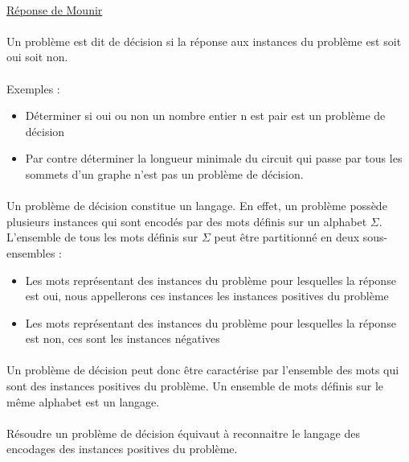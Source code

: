 \paragraph{}
\underline{Réponse de Mounir}
\paragraph{}
Un problème est dit de décision si la réponse aux instances du problème est soit oui soit non.
\paragraph{}
Exemples :
\begin{itemize}
\item Déterminer si oui ou non un nombre entier n est pair est un problème de décision
\item Par contre déterminer la longueur minimale du circuit qui passe par tous les sommets d’un graphe n’est pas un problème de décision.
\end{itemize}
\paragraph{}
Un problème de décision constitue un langage. En effet, un problème possède plusieurs instances qui sont encodés par des mots définis sur un alphabet $\Sigma$. L’ensemble de tous les mots définis sur $\Sigma$ peut être partitionné en deux sous-ensembles :
\begin{itemize}
\item Les mots représentant des instances du problème pour lesquelles la réponse est oui, nous appellerons ces instances les instances positives du problème
\item Les mots représentant des instances du problème pour lesquelles la réponse est non, ces sont les instances négatives
\end{itemize}
\paragraph{}
Un problème de décision peut donc être caractérise par l’ensemble des mots qui sont des instances positives du problème. Un ensemble de mots définis sur le même alphabet est un langage.
\paragraph{}
Résoudre un problème de décision équivaut à reconnaitre le langage des encodages des instances positives du problème.
